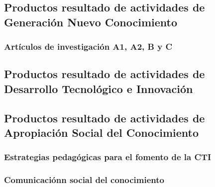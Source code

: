 \documentclass[12pt]{article}
\begin{document}


 
\subsection{Productos resultado de actividades de Generación Nuevo
  Conocimiento} 

\subsubsection{Art\'iculos de investigaci\'on A1, A2, B y C}

\subsection{Productos resultado de actividades de Desarrollo
  Tecnol\'ogico e Innovaci\'on} 

\subsection{Productos resultado de actividades de Apropiación Social
  del Conocimiento} 

\subsubsection{Estrategias pedag\'ogicas para el fomento de la CTI}

\subsubsection{Comunicaci\'onn social del conocimiento}
\end{document}
